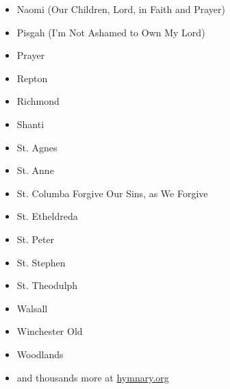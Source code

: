 \begin{itemize}
	\item Naomi (\textup{Our Children, Lord, in Faith and Prayer})
	\item Pisgah (\textup{I'm Not Ashamed to Own My Lord})
	\item Prayer
	\item Repton
	\item Richmond
	\item Shanti
	\item St. Agnes
	\item St. Anne
	\item St. Columba \textup{Forgive Our Sins, as We Forgive}
	\item St. Etheldreda
	\item St. Peter
	\item St. Stephen
	\item St. Theodulph
	\item Walsall
	\item Winchester Old
	\item Woodlands
	\item \textup{and thousands more at \href{https://hymnary.org/search?page=3&qu=meter\%3A8.6.8.6\%20in\%3Atunes&sort=totalInstances}{hymnary.org}}
\end{itemize}

